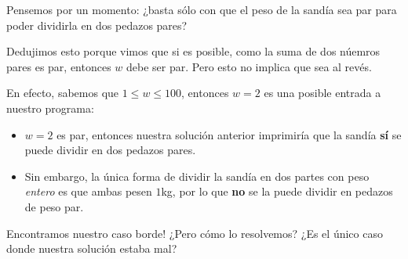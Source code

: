\documentclass{beamer}
\begin{document}
    \begin{frame}[noframenumbering]
        Pensemos por un momento: ¿basta sólo con que el peso de la sandía sea par para poder dividirla en dos pedazos pares? \pause

        Dedujimos esto porque vimos que si es posible, como la suma de dos núemros pares es par, entonces $w$ debe ser par. Pero esto no implica que sea al revés.\pause

        En efecto, sabemos que $1 \leq w \leq 100$, entonces $w = 2$ es una posible entrada a nuestro programa: \pause
            \begin{itemize}
                \item $w = 2$ es par, entonces nuestra solución anterior imprimiría que la sandía \textbf{sí} se puede dividir en dos pedazos pares.\pause
                \item Sin embargo, la única forma de dividir la sandía en dos partes con peso \textit{entero} es que ambas pesen $1$kg, por lo que \textbf{no} se la puede dividir en pedazos de peso par.\pause
            \end{itemize}

        Encontramos nuestro caso borde! \pause ¿Pero cómo lo resolvemos? ¿Es el único caso donde nuestra solución estaba mal?
    \end{frame}
\end{document}
